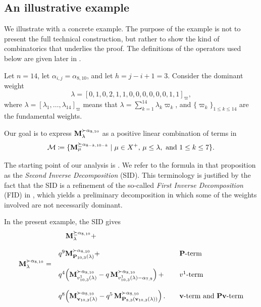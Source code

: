 \subsection{An illustrative example}

We illustrate  with a concrete example. The purpose of the example is not to present the full technical construction, but rather to show the kind of combinatorics that underlies the proof. The definitions of the operators used below are given later in .

Let $n=14$, let $\alpha_{i,j}=\alpha_{8,10}$, and let $h=j-i+1=3$. Consider the dominant weight
\begin{equation}
\lambda = [0,1,0,2,1,1,0,0,0,0,0,0,1,1]_{\varpi},
\end{equation}
where $\lambda=[\lambda_1,\ldots,\lambda_{14}]_{\varpi}$ means that $\lambda=\sum_{k=1}^{14}\lambda_k\varpi_k$, and $\{\varpi_k\}_{1\leq k\leq 14}$ are the fundamental weights.

Our goal is to express $\mathbf{M}_{\lambda}^{\succ \alpha_{8,10}}$ as a positive linear combination of terms in
\begin{equation}
 \mathcal{M}\coloneqq \{\mathbf{M}_{\mu}^{\succeq \alpha_{8-k,10-k}}\mid \mu\in X^+,\, \mu\leq\lambda, \mbox{ and } 1\leq k\leq 7\}.
\end{equation}

The starting point of our analysis is . 
We refer to the formula in that proposition as the \emph{Second Inverse Decomposition} (SID). 
This terminology is justified by the fact that the SID is a refinement of the so-called \emph{First Inverse Decomposition} (FID) in , which yields a preliminary decomposition in which some of the weights involved are not necessarily dominant.


In the present example, the SID gives
\begin{equation} \label{eq:ejemplo-intro}
\begin{array}{rlll}
        & \quad\mathbf{M}_\lambda^{\succeq \alpha_{8,10}}  + & &  \\
        &   &  &  \\
   &  q^9 \mathbf{M}_{\mathbf{P}_{10,3}(\lambda)}^{\succ \alpha_{8,10}} + & & \mathbf{P}\mbox{-term} \\
   \mathbf{M}_\lambda^{\succ \alpha_{8,10}} =  & &  &    \\
     &q^{4}\!\left(\mathbf{M}_{v_{10,3}^1(\lambda)}^{\succ \alpha_{8,10}} 
- q\, \mathbf{M}_{v_{10,3}^1(\lambda)-\alpha_{7,9}}^{\succ \alpha_{8,10}}\right) + & & v^1\mbox{-term}  \\
& & &  \\
     & q^{8}\!\left(\mathbf{M}_{\mathbf{v}_{10,3}(\lambda)}^{\succ \alpha_{8,10}} 
- q^5\, \mathbf{M}_{\mathbf{P}_{8,3}(\mathbf{v}_{10,3}(\lambda))}^{\succ \alpha_{8,10}}\right).  & & \mathbf{v}\mbox{-term and } \mathbf{Pv}\mbox{-term}  \\
\end{array}
\end{equation}

